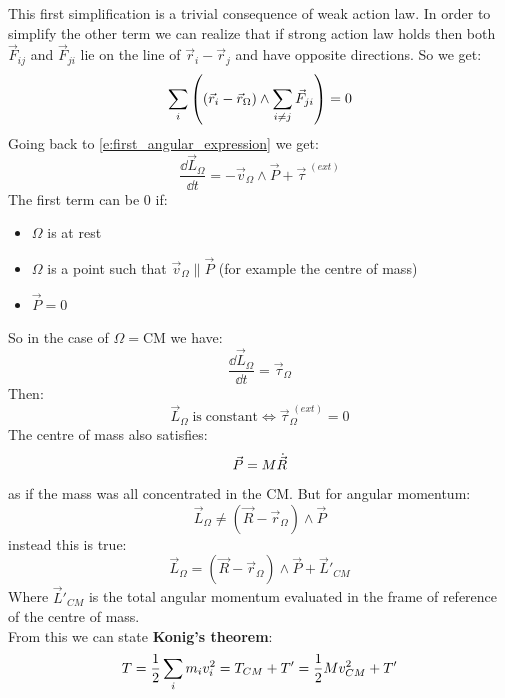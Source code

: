 This first simplification is a trivial consequence of weak action law. In order to simplify the other term we can realize that if strong action law holds then both $\vec{F}_{ij}$ and $\vec{F}_{ji}$ lie on the line of $\vec{r}_i-\vec{r}_j$ and have opposite directions.
So we get:
\begin{equation}
    \displaystyle\sum_{i}\left(\left(\vec{r}_i-\vec{r}_{\Omega}\right)\wedge\displaystyle\sum_{i\neq j}\vec{F}_{ji}\right) = 0
\end{equation}
Going back to \eqref{e:first_angular_expression} we get:
\begin{equation}
    \dfrac{\dd{\vec{L}_{\Omega}}}{\dd{t}} = -\vec{v}_{\Omega}\wedge\vec{P} + \vec{\tau}^{\;(ext)}
\end{equation}
The first term can be 0 if:
\begin{itemize}
    \item $\Omega$ is at rest
    \item $\Omega$ is a point such that $\vec{v}_{\Omega} \parallel \vec{P}$ (for example the centre of mass)
    \item $\vec{P}=0$
\end{itemize}
So in the case of $\Omega = \mathrm{CM}$ we have:
\begin{equation} \label{e:first_cardinal}
    \dfrac{\dd{\vec{L}_{\Omega}}}{\dd{t}} = \vec{\tau}_{\Omega}
\end{equation}
Then:
\begin{equation}
    \vec{L}_{\Omega}\;\mathrm{is\;constant} \iff \vec{\tau}_{\Omega}^{\;(ext)}=0
\end{equation}
The centre of mass also satisfies:
\begin{equation}
    \vec{P} = M\dot{\vec{R}}
\end{equation}
as if the mass was all concentrated in the CM. But for angular momentum:
\begin{equation}
    \vec{L}_{\Omega} \neq (\vec{R}-\vec{r}_{\Omega})\wedge\vec{P}
\end{equation}
instead this is true:
\begin{equation}
    \vec{L}_{\Omega} = (\vec{R}-\vec{r}_{\Omega})\wedge\vec{P} + \vec{L}'_{CM}
\end{equation}
Where $\vec{L}'_{CM}$ is the total angular momentum evaluated in the frame of reference of the centre of mass.\\
From this we can state \textbf{Konig's theorem}:
\begin{equation}
    T = \dfrac{1}{2}\displaystyle\sum_i m_i v_i^2 = T_{CM} + T' = \dfrac{1}{2}M v_{CM}^2 + T'
\end{equation}
